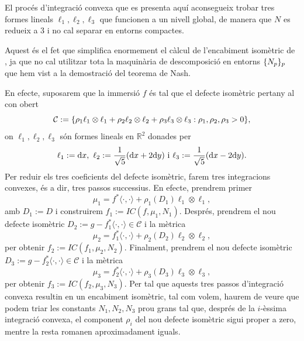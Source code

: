 El procés d'integració convexa que es presenta aquí aconsegueix trobar tres formes lineals $\ell_1, \ell_2, \ell_3$ que funcionen a un nivell global, de manera que $N$ es redueix a $3$ i no cal separar en entorns compactes.

\begin{obs}
    Aquest és el fet que simplifica enormement el càlcul de l'encabiment isomètric de \cite{borrelli2013}, ja que no cal utilitzar tota la maquinària de descomposició en entorns $\{N_p\}_p$ que hem vist a la demostració del teorema de Nash.
\end{obs}

En efecte, suposarem que la immersió $f$ és tal que el defecte isomètric pertany al con obert
\begin{equation*}
    \mathcal C:=\{\rho_1\ell_1\otimes\ell_1 + \rho_2\ell_2\otimes\ell_2 + \rho_3\ell_3\otimes\ell_3 : \rho_1, \rho_2, \rho_3 > 0\},
\end{equation*}
on $\ell_1, \ell_2, \ell_3$ són formes lineals en $\mathbb R^2$ donades per 
\begin{equation*}
    \ell_1:=\text dx, \text{ } \ell_2:=\frac{1}{\sqrt5}(\text dx + 2\text dy) \text{ i } \ell_3:=\frac{1}{\sqrt5}(\text dx - 2\text dy).
\end{equation*}
Per reduir els tres coeficients del defecte isomètric, farem tres integracions convexes, és a dir, tres passos successius. En efecte, prendrem primer
\begin{equation*}
    \mu_1 = f^*\langle\cdot, \cdot\rangle + \rho_1(D_1)\ell_1\otimes\ell_1,
\end{equation*}
amb $D_1:=D$ i construirem $f_1:=IC(f, \mu_1, N_1)$. Després, prendrem el nou defecte isomètric $D_2 := g-f_1^*\langle\cdot, \cdot\rangle\in\mathcal C$ i la mètrica
\begin{equation*}
    \mu_2 = f_1^*\langle\cdot, \cdot\rangle + \rho_2(D_2)\ell_2\otimes\ell_2,
\end{equation*}
 per obtenir $f_2:=IC(f_1, \mu_2, N_2)$. Finalment, prendrem el nou defecte isomètric $D_3 := g-f_2^*\langle\cdot, \cdot\rangle\in\mathcal C$ i la mètrica
\begin{equation*}
    \mu_3 = f_2^*\langle\cdot, \cdot\rangle + \rho_3(D_3)\ell_3\otimes\ell_3,
\end{equation*}
per obtenir $f_3:=IC(f_2, \mu_3, N_3)$. Per tal que aquests tres passos d'integració convexa resultin en un encabiment isomètric, tal com volem, haurem de veure que podem triar les constants $N_1, N_2, N_3$ prou grans tal que, després de la $i$-èssima integració convexa, el component $\rho_i$ del nou defecte isomètric sigui proper a zero, mentre la resta romanen aproximadament iguals. 

